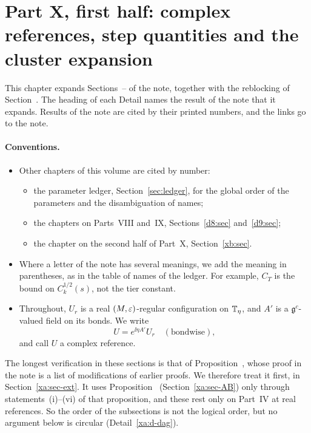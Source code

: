 \providecommand{\xaabs}[1]{\lvert#1\rvert}
\providecommand{\xanorm}[1]{\lVert#1\rVert}
\section{Part X, first half: complex references, step quantities and the cluster expansion}\label{xa:sec}

This chapter expands Sections~-- of the note, together with the reblocking of Section~. The heading of each Detail names the result of the note that it expands. Results of the note are cited by their printed numbers, and the links go to the note.

\paragraph{Conventions.}
\begin{itemize}
\item Other chapters of this volume are cited by number:
  \begin{itemize}
  \item the parameter ledger, Section~\ref{sec:ledger}, for the global order of the parameters and the disambiguation of names;
  \item the chapters on Parts~VIII and~IX, Sections~\ref{d8:sec} and~\ref{d9:sec};
  \item the chapter on the second half of Part~X, Section~\ref{xb:sec}.
  \end{itemize}
\item Where a letter of the note has several meanings, we add the meaning in parentheses, as in the table of names of the ledger. For example, $C_T$ is the bound on $C_k^{1/2}(s)$, not the tier constant.
\item Throughout, $U_r$ is a real $(M,\varepsilon)$-regular configuration on $\mathbb T_\eta$, and $A'$ is a $\mathfrak g^c$-valued field on its bonds. We write
\[
U=e^{\ii\eta A'}U_r\quad(\text{bondwise}),
\]
and call $U$ a complex reference.
\end{itemize}

The longest verification in these sections is that of Proposition~, whose proof in the note is a list of modifications of earlier proofs. We therefore treat it first, in Section~\ref{xa:sec-ext}. It uses Proposition~ (Section~\ref{xa:sec-AB}) only through statements~(i)--(vi) of that proposition, and these rest only on Part~IV at real references. So the order of the subsections is not the logical order, but no argument below is circular (Detail~\ref{xa:d-dag}).

